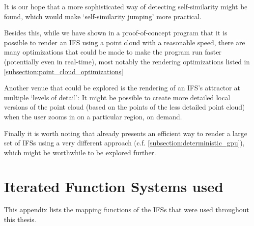 \documentclass[11pt]{article}
\begin{document}
It is our hope that a more sophisticated way of detecting self-similarity might be found,
which would make `self-similarity jumping' more practical.

Besides this, while we have shown in a proof-of-concept program that it is possible to render an IFS using a point cloud
with a reasonable speed, there are many optimizations that could be made to make the program run faster (potentially even in real-time),
most notably the rendering optimizations listed in \autoref{subsection:point_cloud_optimizations}

Another venue that could be explored is the rendering of an IFS's attractor at multiple `levels of detail':
It might be possible to create more detailed local versions of the point cloud (based on the points of the less detailed point cloud) when the user
zooms in on a particular region, on demand.

Finally it is worth noting that \cite{lawlor2012gpu} already presents an efficient way to render 
a large set of IFSs using a very different approach (c.f. \autoref{subsection:deterministic_gpu}), 
which might be worthwhile to be explored further.

\pagebreak
\printbibliography
\clearpage

\appendix

\section{Iterated Function Systems used}
\label{sec:org0657420}

This appendix lists the mapping functions of the IFSs that were used throughout this thesis.
\end{document}
